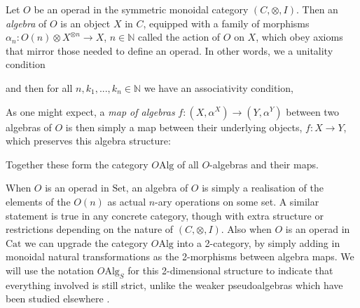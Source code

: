 \begin{defn} \label{opalg} Let $O$ be an operad in the symmetric monoidal category $(C, \otimes, I)$. Then an \emph{algebra} of $O$ is an object $X$ in $C$, equipped with a family of morphisms $\alpha_n : O(n) \otimes X^{\otimes n} \to X$, $n \in \mathbb{N}$ called the action of $O$ on $X$, which obey axioms that mirror those needed to define an operad. In other words, we a unitality condition
\begin{eq*}  \end{eq*}
and then for all $n, k_1, ...,  k_n \in \mathbb{N}$ we have an associativity condition,
\begin{eq*}  \end{eq*}
As one might expect, a \emph{map of algebras} $f: (X, \alpha^X) \to (Y, \alpha^Y)$ between two algebras of $O$ is then simply a map between their underlying objects, $f: X \to Y$, which preserves this algebra structure:
\begin{eq*}  \end{eq*}
Together these form the category $O\mathrm{Alg}$ of all $O$-algebras and their maps.
\end{defn}

When $O$ is an operad in $\mathrm{Set}$, an algebra of $O$ is simply a realisation of the elements of the $O(n)$ as actual $n$-ary operations on some set. A similar statement is true in any concrete category, though with extra structure or restrictions depending on the nature of $(C, \otimes, I)$. Also when $O$ is an operad in $\mathrm{Cat}$ we can upgrade the category $O\mathrm{Alg}$ into a 2-category, by simply adding in monoidal natural transformations as the 2-morphisms between algebra maps. We will use the notation $O\mathrm{Alg}_{S}$ for this 2-dimensional structure to indicate that everything involved is still strict, unlike the weaker pseudoalgebras which have been studied elsewhere \cite{ogge}.

